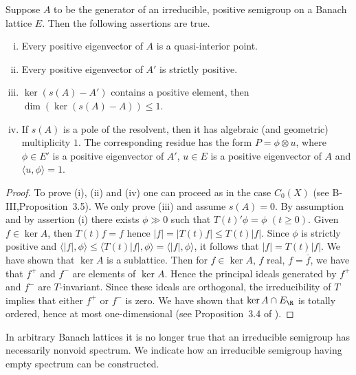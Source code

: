 \begin{proposition}\label{prop:c3-3.5}
	
	Suppose $A$ to be the generator of an irreducible, positive semigroup on a Banach lattice $E$.
	Then the following assertions are true.
	\begin{enumerate}[(i), wide]
	\item 
	Every positive eigenvector of $A$ is a quasi-interior point.
	
	\item 
	Every positive eigenvector of $A'$ is strictly positive.
	
	\item 
	$\ker(s(A) - A')$ contains a positive element, then $\dim(\ker(s(A) - A)) \leq 1$.
	
	\item If $s(A)$ is a pole of the resolvent, then it has algebraic (and geometric) multiplicity $1$.
	The corresponding residue has the form $P = \phi\otimes u$, where $\phi \in E'$ is a positive eigenvector of $A'$, $u \in E$ is a positive eigenvector of $A$ and $\langle u,\phi \rangle = 1$.
	\end{enumerate}
\end{proposition}
	\begin{proof}
		To prove (i), (ii) and (iv) one can proceed as in the case $C_{0}(X)$ (see B-III,Proposition~3.5).
		We only prove (iii) and assume $s(A) = 0$.
		By assumption and by assertion (i) there exists $\phi \gg 0$ such that $T(t)'\phi = \phi$ $(t\geq0)$.
		Given $f \in \ker A$, then $T(t)f = f$ hence $|f| = |T(t)f| \leq T(t)|f|$.
		Since $\phi$ is strictly positive and $\langle|f|,\phi\rangle \leq \langle T(t)|f|,\phi\rangle = \langle|f|,\phi\rangle$, it follows that $|f| = T(t)|f|$.
		We have shown that $\ker A$ is a sublattice.
		Then for $f \in \ker A$, $f$ real, \ie  $f = \overline{f}$, we have that $f^{+}$ and $f^{-}$ are elements of $\ker A$.
		Hence the principal ideals generated by $f^{+}$ and $f^{-}$ are $T$-invariant.
		Since these ideals are orthogonal, the irreducibility of $T$ implies that either $f^{+}$ or $f^{-}$ is zero.
%
		We have shown that $\ker A \cap E_{\R }$ is totally ordered, hence at most one-dimensional (see Proposition~3.4 of \citet{schaefer:1974}).
	\end{proof}

In arbitrary Banach lattices it is no longer true that an irreducible semigroup has necessarily nonvoid spectrum.
We indicate how an irreducible semigroup having empty spectrum can be constructed.

